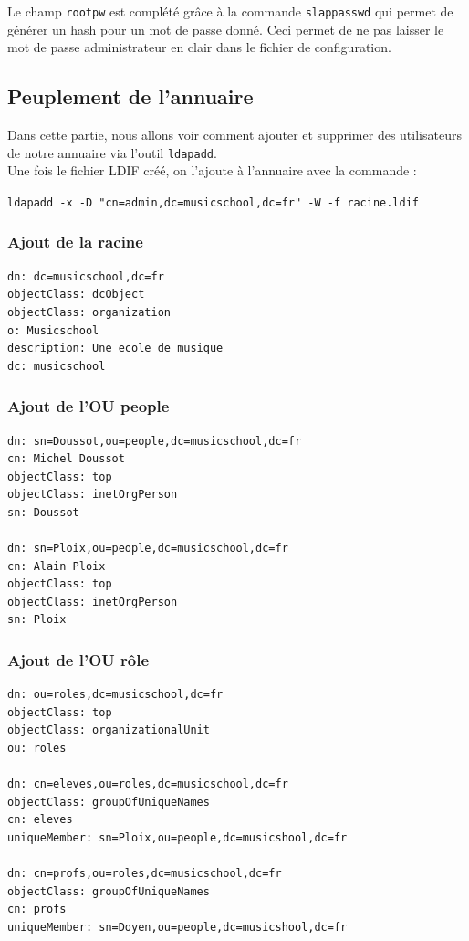 \documentclass[12pt,a4paper,notitlepage]{article}
\begin{document}
Le champ  \texttt{rootpw} est complété grâce à la commande \texttt{slappasswd} qui permet de générer un hash pour un mot de passe donné. Ceci permet de ne pas laisser le mot de passe administrateur en clair dans le fichier de configuration.\\


\subsection{Peuplement de l'annuaire}
Dans cette partie, nous allons voir comment ajouter et supprimer des utilisateurs de notre annuaire via l'outil \texttt{ldapadd}.\\

Une fois le fichier LDIF créé, on l'ajoute à l'annuaire avec la commande :

\noindent \texttt{ldapadd -x -D "cn=admin,dc=musicschool,dc=fr" -W -f racine.ldif}

\subsubsection{Ajout de la racine}

\begin{lstlisting}[title=racine.ldif]
dn: dc=musicschool,dc=fr
objectClass: dcObject
objectClass: organization
o: Musicschool
description: Une ecole de musique 
dc: musicschool 
\end{lstlisting}


\subsubsection{Ajout de l'OU people}

\begin{lstlisting}[title=people.ldif]
dn: sn=Doussot,ou=people,dc=musicschool,dc=fr
cn: Michel Doussot
objectClass: top
objectClass: inetOrgPerson
sn: Doussot

dn: sn=Ploix,ou=people,dc=musicschool,dc=fr
cn: Alain Ploix
objectClass: top
objectClass: inetOrgPerson
sn: Ploix
\end{lstlisting}

\subsubsection{Ajout de l'OU rôle}

\begin{lstlisting}[title=role.ldif]
dn: ou=roles,dc=musicschool,dc=fr
objectClass: top
objectClass: organizationalUnit
ou: roles

dn: cn=eleves,ou=roles,dc=musicschool,dc=fr
objectClass: groupOfUniqueNames
cn: eleves
uniqueMember: sn=Ploix,ou=people,dc=musicshool,dc=fr

dn: cn=profs,ou=roles,dc=musicschool,dc=fr
objectClass: groupOfUniqueNames
cn: profs
uniqueMember: sn=Doyen,ou=people,dc=musicshool,dc=fr
\end{lstlisting}
\end{document}
